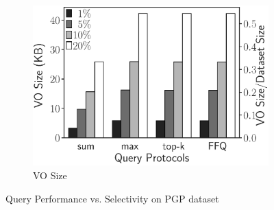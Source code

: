 \begin{figure}[t]
\begin{subfigure}[b]{.33\linewidth}
    \includegraphics[height=\ht\figbox]{exp-figs/aggregate-queries/pgp_vo.eps}
    \caption{VO Size}
  \end{subfigure}
  \caption{Query Performance vs. Selectivity on PGP dataset}\label{fig:aggregate-queries:pgp}


\end{figure}
